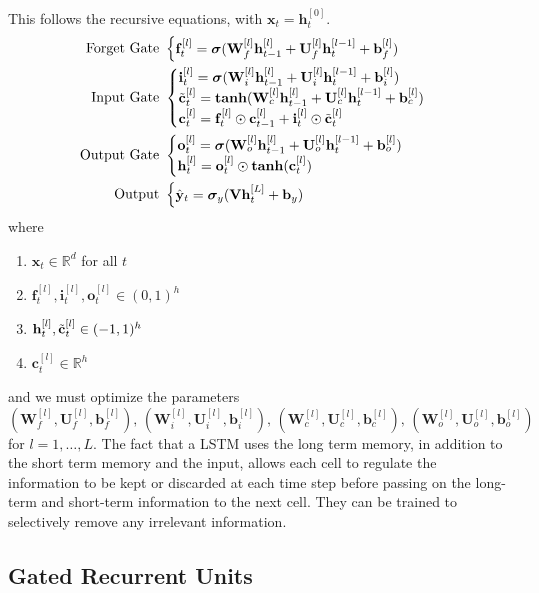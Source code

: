 \documentclass{article}
\begin{document}
    This follows the recursive equations, with $\mathbf{x}_t = \mathbf{h}^{[0]}_{t}$. 
    \begin{align}
      \text{Forget Gate } & \begin{cases} \mathbf{f}_t^{[l]} = \boldsymbol{\sigma}( \mathbf{W}_f^{[l]} \mathbf{h}_{t-1}^{[l]} + \mathbf{U}_f^{[l]} \mathbf{h}_t^{[l-1]} + \mathbf{b}_f^{[l]} ) \end{cases} \\
      \text{Input Gate } & \begin{cases} \mathbf{i}_t^{[l]} = \boldsymbol{\sigma}( \mathbf{W}_i^{[l]} \mathbf{h}_{t-1}^{[l]} + \mathbf{U}_i^{[l]} \mathbf{h}_t^{[l-1]} + \mathbf{b}_i^{[l]} ) \\
          \Tilde{\mathbf{c}}_t^{[l]} = \boldsymbol{\tanh}( \mathbf{W}_c^{[l]} \mathbf{h}_{t-1}^{[l]} + \mathbf{U}_c^{[l]} \mathbf{h}_t^{[l-1]} + \mathbf{b}_c^{[l]} ) \\ 
          \mathbf{c}_t^{[l]} = \mathbf{f}_t^{[l]} \odot \mathbf{c}_{t-1}^{[l]} + \mathbf{i}_t^{[l]} \odot \Tilde{\mathbf{c}}_t^{[l]}  \end{cases} \\
          \text{Output Gate } & \begin{cases} \mathbf{o}_t^{[l]} = \boldsymbol{\sigma}( \mathbf{W}_o^{[l]} \mathbf{h}_{t-1}^{[l]} + \mathbf{U}_o^{[l]} \mathbf{h}_t^{[l-1]} + \mathbf{b}_o^{[l]} ) \\
          \mathbf{h}_t^{[l]} = \mathbf{o}_t^{[l]} \odot \boldsymbol{\tanh}(\mathbf{c}_t^{[l]})
           \end{cases} \\
           \text{Output } & \begin{cases} \hat{\mathbf{y}}_t = \boldsymbol{\sigma}_y ( \mathbf{V} \mathbf{h}_t^{[L]} + \mathbf{b}_y) \end{cases}
    \end{align}
    where 
    \begin{enumerate}
      \item $\mathbf{x}_t \in \mathbb{R}^d$ for all $t$ 
      \item $\mathbf{f}_t^{[l]}, \mathbf{i}_t^{[l]}, \mathbf{o}_t^{[l]} \in (0, 1)^h$
      \item $\mathbf{h}_t^{[l]}, \Tilde{\mathbf{c}}_t^{[l]} \in (-1, 1)^h$
      \item $\mathbf{c}_t^{[l]} \in \mathbb{R}^h$
    \end{enumerate}
    and we must optimize the parameters 
    \begin{equation}
      (\mathbf{W}_f^{[l]}, \mathbf{U}_f^{[l]}, \mathbf{b}_f^{[l]}), \, (\mathbf{W}_i^{[l]}, \mathbf{U}_i^{[l]}, \mathbf{b}_i^{[l]}), \, (\mathbf{W}_c^{[l]}, \mathbf{U}_c^{[l]}, \mathbf{b}_c^{[l]}), \, (\mathbf{W}_o^{[l]}, \mathbf{U}_o^{[l]}, \mathbf{b}_o^{[l]})
    \end{equation}
    for $l = 1, \ldots, L$. The fact that a LSTM uses the long term memory, in addition to the short term memory and the input, allows each cell to regulate the information to be kept or discarded at each time step before passing on the long-term and short-term information to the next cell. They can be trained to selectively remove any irrelevant information. 


  \subsection{Gated Recurrent Units}




\end{document}

